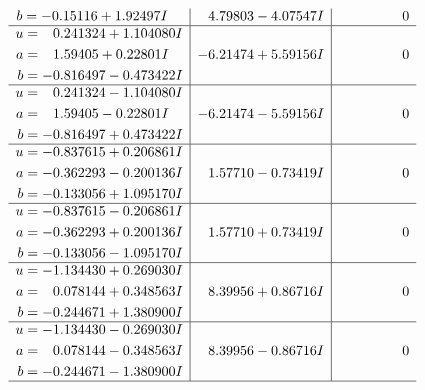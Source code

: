 \documentclass[1p]{elsarticle_modified}
\theoremstyle{definition}
\begin{document}
$$\begin{array}{c|c|c}
\begin{aligned}
b &= -0.15116 + 1.92497 I\end{aligned}
 & \phantom{-}4.79803 - 4.07547 I & \phantom{-0.000000 } 0 \\ \hline\begin{aligned}
u &= \phantom{-}0.241324 + 1.104080 I \\
a &= \phantom{-}1.59405 + 0.22801 I \\
b &= -0.816497 - 0.473422 I\end{aligned}
 & -6.21474 + 5.59156 I & \phantom{-0.000000 } 0 \\ \hline\begin{aligned}
u &= \phantom{-}0.241324 - 1.104080 I \\
a &= \phantom{-}1.59405 - 0.22801 I \\
b &= -0.816497 + 0.473422 I\end{aligned}
 & -6.21474 - 5.59156 I & \phantom{-0.000000 } 0 \\ \hline\begin{aligned}
u &= -0.837615 + 0.206861 I \\
a &= -0.362293 - 0.200136 I \\
b &= -0.133056 + 1.095170 I\end{aligned}
 & \phantom{-}1.57710 - 0.73419 I & \phantom{-0.000000 } 0 \\ \hline\begin{aligned}
u &= -0.837615 - 0.206861 I \\
a &= -0.362293 + 0.200136 I \\
b &= -0.133056 - 1.095170 I\end{aligned}
 & \phantom{-}1.57710 + 0.73419 I & \phantom{-0.000000 } 0 \\ \hline\begin{aligned}
u &= -1.134430 + 0.269030 I \\
a &= \phantom{-}0.078144 + 0.348563 I \\
b &= -0.244671 + 1.380900 I\end{aligned}
 & \phantom{-}8.39956 + 0.86716 I & \phantom{-0.000000 } 0 \\ \hline\begin{aligned}
u &= -1.134430 - 0.269030 I \\
a &= \phantom{-}0.078144 - 0.348563 I \\
b &= -0.244671 - 1.380900 I\end{aligned}
 & \phantom{-}8.39956 - 0.86716 I & \phantom{-0.000000 } 0\\
 \hline 
 \end{array}$$\newpage$$\begin{array}{c|c|c}  

\end{array}$$
\end{document}
